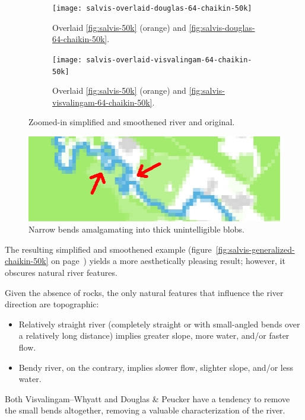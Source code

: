 \documentclass[a4paper]{article}
\newcommand{\onpage}[1]{\ref{#1} on page~\pageref{#1}}
\newcommand{\DP}{Douglas \& Peucker}
\newcommand{\VW}{Visvalingam--Whyatt}
\begin{document}
\begin{figure}[ht!]
    \centering
    \begin{subfigure}[b]{.49\textwidth}
        \texttt{[image: salvis-overlaid-douglas-64-chaikin-50k]}

        \caption{Overlaid \ref{fig:salvis-50k} (orange) and
            \ref{fig:salvis-douglas-64-chaikin-50k}.}

    \end{subfigure}
    \hfill
    \begin{subfigure}[b]{.49\textwidth}
        \texttt{[image: salvis-overlaid-visvalingam-64-chaikin-50k]}

        \caption{Overlaid \ref{fig:salvis-50k} (orange) and
            \ref{fig:salvis-visvalingam-64-chaikin-50k}.}

    \end{subfigure}
    \caption{Zoomed-in simplified and smoothened river and original.}
    \label{fig:salvis-overlaid-generalized-chaikin-50k}
\end{figure}

\begin{figure}[b!]
    \centering
    \includegraphics[width=.9\textwidth]{amalgamate1}
    \caption{Narrow bends amalgamating into thick unintelligible blobs.}
    \label{fig:pixel-amalgamation}
\end{figure}

The resulting simplified and smoothened example
(figure~\onpage{fig:salvis-generalized-chaikin-50k}) yields a more
aesthetically pleasing result; however, it obscures natural river features.

Given the absence of rocks, the only natural features that influence the river
direction are topographic:

\begin{itemize}
    \item Relatively straight river (completely straight or with small-angled
        bends over a relatively long distance) implies greater slope, more
        water, and/or faster flow.

    \item Bendy river, on the contrary, implies slower flow, slighter slope,
        and/or less water.

\end{itemize}
Both {\VW} and {\DP} have a tendency to remove the small bends altogether,
removing a valuable characterization of the river.
\end{document}
